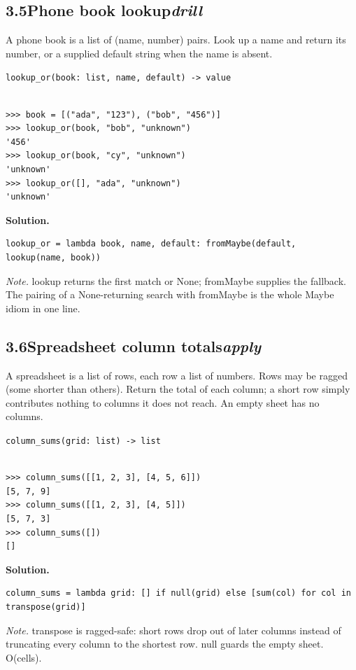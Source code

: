 \documentclass[10pt,letterpaper]{book}
\begin{document}
\subsection*{3.5\quad Phone book lookup\hfill\textnormal{\textit{drill}}}
A phone book is a list of (name, number) pairs. Look up a name and return its number, or a supplied default string when the name is absent.

\noindent\texttt{lookup\_or(book: list, name, default) -> value}
\begin{lstlisting}[style=ex]

>>> book = [("ada", "123"), ("bob", "456")]
>>> lookup_or(book, "bob", "unknown")
'456'
>>> lookup_or(book, "cy", "unknown")
'unknown'
>>> lookup_or([], "ada", "unknown")
'unknown'

\end{lstlisting}
\noindent\textbf{Solution.}
\begin{lstlisting}[style=code]
lookup_or = lambda book, name, default: fromMaybe(default, lookup(name, book))
\end{lstlisting}
\noindent\textit{Note.} lookup returns the first match or None; fromMaybe supplies the fallback. The pairing of a None-returning search with fromMaybe is the whole Maybe idiom in one line.

\subsection*{3.6\quad Spreadsheet column totals\hfill\textnormal{\textit{apply}}}
A spreadsheet is a list of rows, each row a list of numbers. Rows may be ragged (some shorter than others). Return the total of each column; a short row simply contributes nothing to columns it does not reach. An empty sheet has no columns.

\noindent\texttt{column\_sums(grid: list) -> list}
\begin{lstlisting}[style=ex]

>>> column_sums([[1, 2, 3], [4, 5, 6]])
[5, 7, 9]
>>> column_sums([[1, 2, 3], [4, 5]])
[5, 7, 3]
>>> column_sums([])
[]

\end{lstlisting}
\noindent\textbf{Solution.}
\begin{lstlisting}[style=code]
column_sums = lambda grid: [] if null(grid) else [sum(col) for col in transpose(grid)]
\end{lstlisting}
\noindent\textit{Note.} transpose is ragged-safe: short rows drop out of later columns instead of truncating every column to the shortest row. null guards the empty sheet. O(cells).
\end{document}
